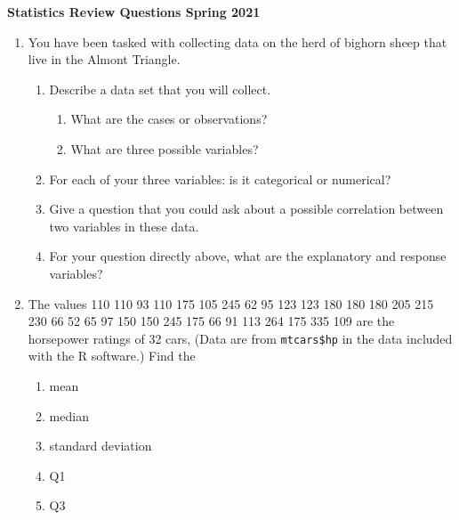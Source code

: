 \documentclass[12pt,fullpage]{amsart}
\begin{document}
\begin{center}\textbf{Statistics Review Questions \quad\ddag\quad Spring 2021}
\end{center}

\hrulefill
\medskip
\begin{enumerate}

\item You have been tasked with collecting data on the herd of bighorn sheep that live in the Almont Triangle.
\begin{enumerate}
  
\item Describe a data set that you will collect.
  \begin{enumerate}
  \item What are the cases or observations?
  \item What are three possible variables? 
  \end{enumerate}
    
\item For each of your three variables: is it categorical or numerical?

\item Give a question that you could ask about a possible correlation between two variables in these data. 

\item For your question directly above, what are the explanatory and response variables?

\end{enumerate}
  
\item The values 110 110  93 110 175 105 245  62  95 123 123 180 180 180 205 215 230  66  52  65  97 150 150 245 175  66  91 113 264 175 335 109 are the horsepower ratings of 32 cars, (Data are from \texttt{mtcars\$hp} in the data included with the R software.)
Find the 
\begin{multicols}{3}
\begin{enumerate}
\item mean

\item median

\item standard deviation

\item Q1

\item Q3

\end{enumerate}
\end{multicols}



\end{enumerate}
\end{document}
